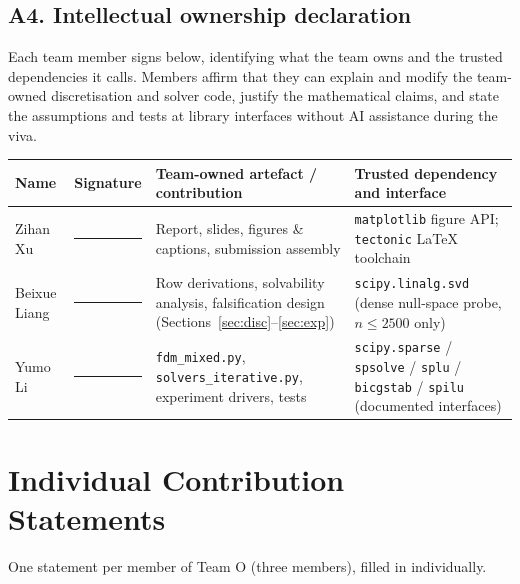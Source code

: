\documentclass[11pt,a4paper]{article}
\begin{document}
\subsection*{A4. Intellectual ownership declaration}
Each team member signs below, identifying what the team owns and the
trusted dependencies it calls.  Members affirm that they can explain and
modify the team-owned discretisation and solver code, justify the
mathematical claims, and state the assumptions and tests at library
interfaces without AI assistance during the viva.
\begin{table}[h]
\centering
\small
\begin{tabular}{@{}p{2.4cm}p{2.4cm}p{4.0cm}p{3.2cm}@{}}
\toprule
Name & Signature & Team-owned artefact / contribution & Trusted
dependency and interface \\
\midrule
Zihan Xu & \rule{1.8cm}{0.4pt} & Report, slides, figures \& captions,
submission assembly & \texttt{matplotlib} figure API;
\texttt{tectonic} \LaTeX{} toolchain \\
Beixue Liang & \rule{1.8cm}{0.4pt} & Row derivations, solvability
analysis, falsification design (Sections~\ref{sec:disc}--\ref{sec:exp})
& \texttt{scipy.linalg.svd} (dense null-space probe, $n \le 2500$ only) \\
Yumo Li & \rule{1.8cm}{0.4pt} & \texttt{fdm\_mixed.py},
\texttt{solvers\_iterative.py}, experiment drivers, tests &
\texttt{scipy.sparse} / \texttt{spsolve} / \texttt{splu} /
\texttt{bicgstab} / \texttt{spilu} (documented interfaces) \\
\bottomrule
\end{tabular}
\end{table}

\newpage
{}
\section{Individual Contribution Statements}
\label{app:ics}

One statement per member of Team O (three members), filled in individually.
\end{document}
